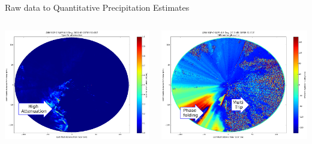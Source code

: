 \documentclass[final]{beamer}
\begin{document}
\begin{frame}{}
\begin{columns}[t]
\begin{column}{.3\linewidth}
\begin{block}{Raw data to Quantitative Precipitation Estimates}
\begin{columns}[t]
\begin{column}{.62\linewidth}
\begin{columns}[t]
\begin{column}{.5\linewidth}
			\includegraphics[width=.95\linewidth]{figures/speca.png}\\[1ex]  
		\end{column}
		 \begin{column}{.5\linewidth}
                		\includegraphics[width=.95\linewidth]{figures/phidp.png}\\[1ex] %

\end{column}
\end{columns}
\end{column}
\end{columns}
\end{block}
\end{column}
\end{columns}
\end{frame}
\end{document}
